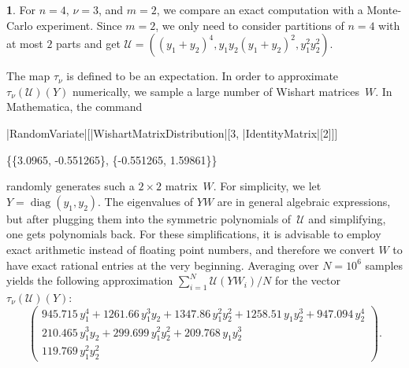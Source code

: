 \documentclass{mathincs}
\numberwithin{equation}{section}
\numberwithin{figure}{section}
\theoremstyle{plain}
\theoremstyle{definition}
\theoremstyle{remark}
\theoremstyle{plain}
\theoremstyle{definition}
\newtheorem{example}[thm]{\protect\examplename}
\theoremstyle{plain}
\theoremstyle{plain}
\DeclareMathOperator{\diag}{diag}
\providecommand{\examplename}{Example}
\begin{document}
\begin{example}
  For $n=4$, $\nu=3$, and $m=2$, we compare an exact computation with a
  Monte-Carlo experiment.  Since $m=2$, we only need to consider partitions
  of $n=4$ with at most $2$ parts and get $\mathcal{U}=\left((y_1+y_2)^4,
  y_1y_2(y_1+y_2)^2, y_1^2y_2^2\right)$. 

  The map $\tau_\nu$ is defined to be an expectation. In order to approximate
  $\tau_\nu(\mathcal{U})(Y)$ numerically, we sample a large number of Wishart
  matrices~$W$. In Mathematica, the command
  \begin{mma}
    \In |RandomVariate|[|WishartMatrixDistribution|[3, |IdentityMatrix|[2]]] \\
    \Out \rule{0pt}{8pt}\{\{3.0965, -0.551265\}, \{-0.551265, 1.59861\}\} \\
  \end{mma}
  \noindent
  randomly generates such a $2\times2$ matrix~$W$. For simplicity, we let
  $Y=\diag(y_1,y_2)$. The eigenvalues of $YW$ are in general algebraic
  expressions, but after plugging them into the symmetric polynomials
  of~$\mathcal{U}$ and simplifying, one gets polynomials back. For these
  simplifications, it is advisable to employ exact arithmetic instead of
  floating point numbers, and therefore we convert $W$ to have exact rational
  entries at the very beginning. Averaging over $N=10^6$ samples yields the
  following approximation $\sum_{i=1}^N \mathcal{U}(YW_i)/N$ for the vector
  $\tau_\nu(\mathcal{U})(Y)$:
  \[
    \begin{pmatrix}
      945.715\,y_1^4 + 1261.66\,y_1^3y_2 + 1347.86\,y_1^2y_2^2 + 1258.51\,y_1y_2^3 + 947.094\,y_2^4 \\
      210.465\,y_1^3y_2 + 299.699\,y_1^2y_2^2 + 209.768\,y_1y_2^3 \\
      119.769\,y_1^2 y_2^2
    \end{pmatrix}.
  \]


\end{example}
\end{document}
